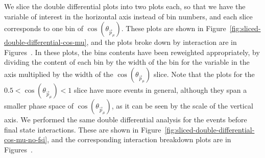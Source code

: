 \documentclass{article}
\begin{document}
We slice the double differential plots into two plots each, so that we have the variable of interest in the horizontal axis instead of bin numbers,
and each slice corresponds to one bin of $\cos(\theta_{\vec{p}_{\mu}})$.
These plots are shown in Figure~\ref{fig:sliced-double-differential-cos-mu}, and the plots broke down by interaction are in 
Figures~.
In these plots, the bins contents have been reweighted 
appropriately, by dividing the content of each bin by the width of the bin for the variable in the axis
multiplied by the width of the $\cos(\theta_{\vec{p}_{\mu}})$ slice.
Note that the plots for the $0.5 < \cos(\theta_{\vec{p}_{\mu}}) < 1$ slice have more events in general, although they span a smaller phase space 
of $\cos(\theta_{\vec{p}_{\mu}})$, as it can be seen by the scale of the vertical axis. 
We performed the same double differential analysis for the events before final state interactions. 
These are shown in Figure~\ref{fig:sliced-double-differential-cos-mu-no-fsi}, and the corresponding interaction 
breakdown plots are in Figures~.
\end{document}
